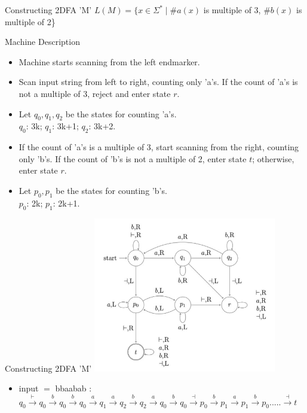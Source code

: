 \documentclass{beamer}
\begin{document}
\begin{frame}{Constructing 2DFA 'M'}
   $L(M) = \{x \in \Sigma^* \mid \#a(x)$ is multiple of 3, $\#b(x)$ is multiple of 2\}
  \begin{exampleblock}{Machine Description}
  \begin{itemize}
  \item Machine starts scanning from the left endmarker.
  \item Scan input string from left to right, counting only 'a's. If the count of 'a's is not a multiple of 3, reject and enter state $r$.\\
  \item Let $q_0,q_1,q_2$ be the states for counting 'a's. \\$q_0$: 3k; $q_1$: 3k+1; $q_2$: 3k+2.
  \item If the count of 'a's is a multiple of 3, start scanning from the right, counting only 'b's. If the count of 'b's is not a multiple of 2, enter state $t$; otherwise, enter state $r$.\\
  \item Let $p_0,p_1$ be the states for counting 'b's. \\$p_0$: 2k; $p_1$: 2k+1.
  \end{itemize}
  \end{exampleblock}
\end{frame}

\begin{frame}{Constructing 2DFA 'M'}
  \centering
  \includegraphics[width=0.6\textwidth]{Screenshot 2024-03-13 at 3.50.28 PM.pdf}
  \begin{itemize}
    
    \item input $=$ bbaabab :\\
    
       $ q_0 \xrightarrow{\vdash} q_0 \xrightarrow{b} q_0 \xrightarrow{b} q_0 \xrightarrow{a} q_1 \xrightarrow{a} q_2 \xrightarrow{b} q_2 \xrightarrow{a} q_0 \xrightarrow{b} q_0 \xrightarrow{\dashv} p_0 \xrightarrow{b} p_1 \xrightarrow {a} p_1 \xrightarrow{b} p_0 .....\xrightarrow{\dashv} t$\\
     
  \end{itemize}
\end{frame}
\end{document}
